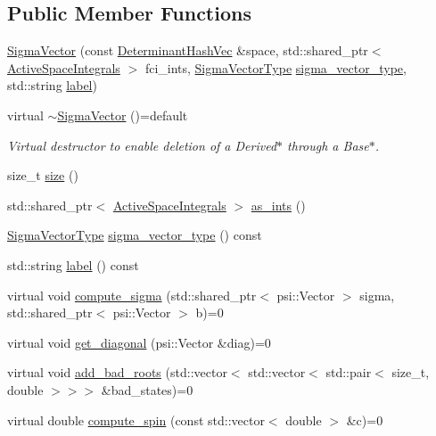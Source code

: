 \subsection*{Public Member Functions}
\begin{DoxyCompactItemize}
\item 
\mbox{\hyperlink{classforte_1_1_sigma_vector_aea65e2b6b76bd9b79c0c300d44eed183}{Sigma\+Vector}} (const \mbox{\hyperlink{classforte_1_1_determinant_hash_vec}{Determinant\+Hash\+Vec}} \&space, std\+::shared\+\_\+ptr$<$ \mbox{\hyperlink{classforte_1_1_active_space_integrals}{Active\+Space\+Integrals}} $>$ fci\+\_\+ints, \mbox{\hyperlink{namespaceforte_a94410e08f0cf9a0cfc5e53c70b6bf485}{Sigma\+Vector\+Type}} \mbox{\hyperlink{classforte_1_1_sigma_vector_a97732026ce8ae60b4852d26405a67997}{sigma\+\_\+vector\+\_\+type}}, std\+::string \mbox{\hyperlink{classforte_1_1_sigma_vector_a24b95b355be4980e8507ba51a891419e}{label}})
\item 
virtual \mbox{\hyperlink{classforte_1_1_sigma_vector_a81f8499f67f12c8c51dcfd60c13faee6}{$\sim$\+Sigma\+Vector}} ()=default
\begin{DoxyCompactList}\small\item\em Virtual destructor to enable deletion of a Derived$\ast$ through a Base$\ast$. \end{DoxyCompactList}\item 
size\+\_\+t \mbox{\hyperlink{classforte_1_1_sigma_vector_a055d903f689b5b503db931e4c903ce01}{size}} ()
\item 
std\+::shared\+\_\+ptr$<$ \mbox{\hyperlink{classforte_1_1_active_space_integrals}{Active\+Space\+Integrals}} $>$ \mbox{\hyperlink{classforte_1_1_sigma_vector_aa732888f759ba00fa059ad1020425fe9}{as\+\_\+ints}} ()
\item 
\mbox{\hyperlink{namespaceforte_a94410e08f0cf9a0cfc5e53c70b6bf485}{Sigma\+Vector\+Type}} \mbox{\hyperlink{classforte_1_1_sigma_vector_a97732026ce8ae60b4852d26405a67997}{sigma\+\_\+vector\+\_\+type}} () const
\item 
std\+::string \mbox{\hyperlink{classforte_1_1_sigma_vector_a24b95b355be4980e8507ba51a891419e}{label}} () const
\item 
virtual void \mbox{\hyperlink{classforte_1_1_sigma_vector_afa184f816a37649a4e2316d62c8b621e}{compute\+\_\+sigma}} (std\+::shared\+\_\+ptr$<$ psi\+::\+Vector $>$ sigma, std\+::shared\+\_\+ptr$<$ psi\+::\+Vector $>$ b)=0
\item 
virtual void \mbox{\hyperlink{classforte_1_1_sigma_vector_a4df4b96c5c24a3560a874eae061a502e}{get\+\_\+diagonal}} (psi\+::\+Vector \&diag)=0
\item 
virtual void \mbox{\hyperlink{classforte_1_1_sigma_vector_a5cd950852f515bc082ca1df31bd84e3e}{add\+\_\+bad\+\_\+roots}} (std\+::vector$<$ std\+::vector$<$ std\+::pair$<$ size\+\_\+t, double $>$$>$$>$ \&bad\+\_\+states)=0
\item 
virtual double \mbox{\hyperlink{classforte_1_1_sigma_vector_afe5ac487b5277b86fbe4398ba861773c}{compute\+\_\+spin}} (const std\+::vector$<$ double $>$ \&c)=0
\end{DoxyCompactItemize}
